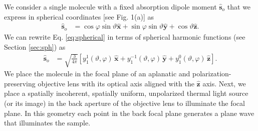\documentclass{osa-article}
\providecommand{\so}[1]{\mathbf{\hat{s}}_o}
\providecommand{\mh}[1]{\mathbf{\hat{#1}}}
\begin{document}
We consider a single molecule with a fixed absorption dipole moment $\so{}$ that
we express in spherical coordinates [see Fig. 1(a)] as 
\begin{align}
  \so{} &= \cos\varphi\sin\vartheta\mh{x} + \sin\varphi\sin\vartheta\mh{y} + \cos\vartheta\mh{z}. \label{eq:spherical}
\end{align}
We can rewrite Eq. \ref{eq:spherical} in terms of spherical harmonic functions
(see Section \ref{sec:sph}) as
\begin{align}
  \so{} &=\sqrt{\frac{3}{4\pi}}\left[y_1^1(\vartheta, \varphi)\,\mh{x} + y_1^{-1}(\vartheta, \varphi)\,\mh{y} + y_1^0(\vartheta, \varphi)\, \mh{z}\right]. \label{eq:sphharm}
\end{align}
We place the molecule in the focal plane of an aplanatic and
polarization-preserving objective lens with its optical axis aligned with the
$\mh{z}$ axis. Next, we place a spatially incoherent, spatially uniform,
unpolarized thermal light source (or its image) in the back aperture of the
objective lens to illuminate the focal plane. In this geometry each point in the
back focal plane generates a plane wave that illuminates the sample.
\end{document}
